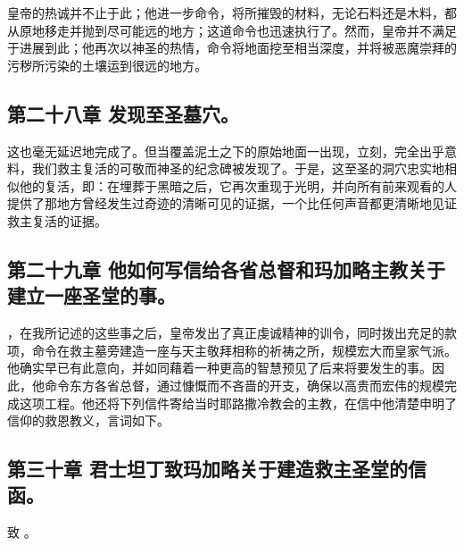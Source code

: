 皇帝的热诚并不止于此；他进一步命令，将所摧毁的材料，无论石料还是木料，都从原地移走并抛到尽可能远的地方；这道命令也迅速执行了。然而，皇帝并不满足于进展到此；他再次以神圣的热情，命令将地面挖至相当深度，并将被恶魔崇拜的污秽所污染的土壤运到很远的地方。\par


\subsection{第二十八章 发现至圣墓穴。}

这也毫无延迟地完成了。但当覆盖泥土之下的原始地面一出现，立刻，完全出乎意料，我们救主复活的可敬而神圣的纪念碑被发现了。于是，这至圣的洞穴忠实地相似他的复活，即：在埋葬于黑暗之后，它再次重现于光明，并向所有前来观看的人提供了那地方曾经发生过奇迹的清晰可见的证据，一个比任何声音都更清晰地见证救主复活的证据。\par


\subsection{第二十九章 他如何写信给各省总督和玛加略主教关于建立一座圣堂的事。}

，在我所记述的这些事之后，皇帝发出了真正虔诚精神的训令，同时拨出充足的款项，命令在救主墓旁建造一座与天主敬拜相称的祈祷之所，规模宏大而皇家气派。他确实早已有此意向，并如同藉着一种更高的智慧预见了后来将要发生的事。因此，他命令东方各省总督，通过慷慨而不吝啬的开支，确保以高贵而宏伟的规模完成这项工程。他还将下列信件寄给当时耶路撒冷教会的主教，在信中他清楚申明了信仰的救恩教义，言词如下。\par


\subsection{第三十章 君士坦丁致玛加略关于建造救主圣堂的信函。}

 致 。\par

